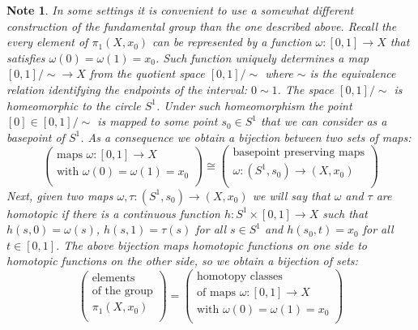 \documentclass[11pt, letterpaper, oneside]{report}
\theoremstyle{pplain}
\theoremstyle{ddefinition}
\newtheorem{note}[theorem]{Note}
\theoremstyle{nnn}
\theoremstyle{eexercise}
\begin{document}
\begin{note}
\label{PI1THROUGHS1 NOTE}
In some settings it is convenient to use a somewhat different construction of the fundamental group
than the one described above. Recall the every element of $\pi_{1}(X, x_{0})$ can be represented by 
a function $\omega \colon [0, 1] \to X$ that satisfies $\omega(0) = \omega(1) = x_{0}$.  Such function uniquely 
determines a map $[0, 1]/{\sim} \to X$ from the quotient space $[0, 1]/{\sim}$ where 
$\sim$ is the equivalence relation identifying the endpoints of the interval: $0\sim 1$. 
The  space $[0, 1]/{\sim}$ is homeomorphic to the circle $S^{1}$. Under such homeomorphism the point 
$[0] \in [0, 1]/{\sim}$ is mapped to some point $s_{0}\in S^{1}$ that we can consider as a basepoint of 
$S^{1}$. As a consequence we obtain a bijection between two sets of maps:
$$
\begin{pmatrix}
\text{maps $\omega \colon [0, 1] \to X$} \\[1mm]
\text{with $\omega(0) = \omega(1) = x_{0}$} \\
\end{pmatrix}
\cong 
\begin{pmatrix}
\text{basepoint preserving maps} \\[1mm]
\text{$\omega \colon (S^{1}, s_{0}) \to (X, x_{0})$} \\
\end{pmatrix}
$$
Next, given two  maps $\omega, \tau\colon (S^{1}, s_{0}) \to (X, x_{0})$ 
we will say that $\omega$ and $\tau$ are homotopic if there is a continuous function 
$h\colon S^{1}\times [0, 1] \to X$ such that $h(s, 0) = \omega(s)$, $h(s, 1) = \tau(s)$ for all $s\in S^{1}$
and $h(s_{0}, t) = x_{0}$ for all $t\in [0, 1]$. The above bijection maps homotopic 
functions on one side to homotopic functions on the other side, so we obtain a bijection of sets:
$$
\begin{pmatrix}
\text{elements} \\[1mm]
\text{of the group} \\[1mm]
\text{$\pi_{1}(X, x_{0})$} \\
\end{pmatrix}
=
\begin{pmatrix}
\text{homotopy classes} \\[1mm]
\text{of maps $\omega \colon [0, 1] \to X$} \\[1mm]
\text{with $\omega(0) = \omega(1) = x_{0}$} \\

\end{pmatrix}$$
\end{note}
\end{document}
